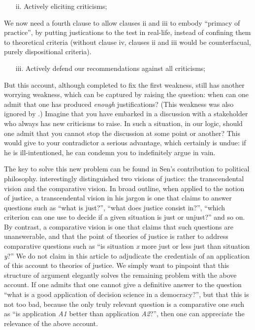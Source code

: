 \documentclass[preprint, french, english, 11pt, authoryear]{elsarticle}%
\begin{document}
\begin{itemize}
\item[ii.]	Actively eliciting criticisms;
\end{itemize}

We now need a fourth clause to allow clauses ii and iii to embody ``primacy of practice'', by putting justications to the test in real-life, instead of confining them to theoretical criteria (without clause iv, clauses ii and iii would be counterfacual, purely dispositional criteria).

\begin{itemize}
\item[iii.]	 Actively defend our recommendations against all criticisms;
\end{itemize}

But this account, although completed to fix the first weakness, still has another worrying weakness, which can be captured by raising the question: when can one admit that one has produced \emph{enough} justifications? (This weakness was also ignored by  \citet{meinard_what_2017}.) Imagine that you have embarked in a discussion with a stakeholder who always has new criticisms to raise. In such a situation, in our logic, should one admit that you cannot stop the discussion at some point or another? This would give to your contradictor a serious advantage, which certainly is undue: if he is ill-intentioned, he can condemn you to indefinitely argue in vain.

The key to solve this new problem can be found in Sen's contribution to political philosophy. \cite{sen_idea_2009} interestingly distinguished two visions of justice: the transcendental vision and the comparative vision. In broad outline, when applied to the notion of justice, a transcendental vision in his jargon is one that claims to answer questions such as ``what is just?'', ``what does justice consist in?'', ``which criterion can one use to decide if a given situation is just or unjust?'' and so on. By contrast, a comparative vision is one that claims that such questions are unanswerable, and that the point of theories of justice is rather to address comparative questions such as ``is situation \emph{x} more just or less just than situation \emph{y}?'' We do not claim in this article to adjudicate the credentials of an application of this account to theories of justice. We simply want to pinpoint that this structure of argument elegantly solves the remaining problem with the above account. If one admits that one cannot give a definitive answer to the question ``what is a good application of decision science in a democracy?'', but that this is not too bad, because the only truly relevant question is a comparative one such as ``is application \emph{A1} better than application \emph{A2}?'', then one can appreciate the relevance of the above account.
\end{document}
